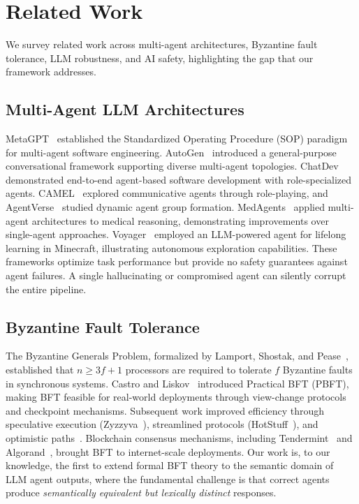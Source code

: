 \documentclass[journal,10pt]{IEEEtran}
\begin{document}
\section{Related Work}\label{sec:related}
We survey related work across multi-agent architectures, Byzantine fault tolerance, LLM robustness, and AI safety, highlighting the gap that our framework addresses.

\subsection{Multi-Agent LLM Architectures}
MetaGPT~\cite{hong2024metagpt} established the Standardized Operating Procedure (SOP) paradigm for multi-agent software engineering. AutoGen~\cite{wu2023autogen} introduced a general-purpose conversational framework supporting diverse multi-agent topologies. ChatDev~\cite{qian2024chatdev} demonstrated end-to-end agent-based software development with role-specialized agents. CAMEL~\cite{li2023camel} explored communicative agents through role-playing, and AgentVerse~\cite{chen2024agentverse} studied dynamic agent group formation. MedAgents~\cite{tang2024medagents} applied multi-agent architectures to medical reasoning, demonstrating improvements over single-agent approaches. Voyager~\cite{wang2024voyager} employed an LLM-powered agent for lifelong learning in Minecraft, illustrating autonomous exploration capabilities. These frameworks optimize task performance but provide no safety guarantees against agent failures. A single hallucinating or compromised agent can silently corrupt the entire pipeline.

\subsection{Byzantine Fault Tolerance}
The Byzantine Generals Problem, formalized by Lamport, Shostak, and Pease~\cite{lamport1982byzantine, pease1980consensus}, established that $n \geq 3f + 1$ processors are required to tolerate $f$ Byzantine faults in synchronous systems. Castro and Liskov~\cite{castro1999practical} introduced Practical BFT (PBFT), making BFT feasible for real-world deployments through view-change protocols and checkpoint mechanisms. Subsequent work improved efficiency through speculative execution (Zyzzyva~\cite{kotla2010zyzzyva}), streamlined protocols (HotStuff~\cite{yin2019hotstuff}), and optimistic paths~\cite{guerraoui2010next}. Blockchain consensus mechanisms, including Tendermint~\cite{buchman2016tendermint} and Algorand~\cite{gilad2017algorand}, brought BFT to internet-scale deployments. Our work is, to our knowledge, the first to extend formal BFT theory to the semantic domain of LLM agent outputs, where the fundamental challenge is that correct agents produce \emph{semantically equivalent but lexically distinct} responses.
\end{document}
